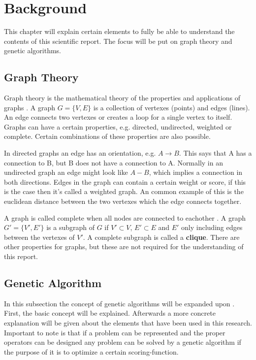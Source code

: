\section{Background}
\label{sec:background}
This chapter will explain certain elements to fully be able to understand the contents of this scientific report.
The focus will be put on graph theory and genetic algorithms.

\subsection{Graph Theory}
Graph theory is the mathematical theory of the properties and applications of graphs \cite{Demoen}.
A graph $G=\lbrace V,E \rbrace$ is a collection of vertexes (points) and edges (lines).
An edge connects two vertexes or creates a loop for a single vertex to itself.
Graphs can have a certain properties, e.g. directed, undirected, weighted or complete.
Certain combinations of these properties are also possible.

In directed graphs an edge has an orientation, e.g. $A \rightarrow B$. This says that A has a connection to B, but B does not have a connection to A.
Normally in an undirected graph an edge might look like $A - B$, which implies a connection in both directions. Edges in the graph can contain a certain weight or score, if this is the case then it's called a weighted graph.
An common example of this is the euclidean distance between the two vertexes which the edge connects together.

A graph is called complete when all nodes are connected to eachother \cite{Demoen}.
A graph $G'=\lbrace V',E' \rbrace$ is a subgraph of $G$ if $V' \subset V$, $E' \subset E$ and $E'$ only including edges between the vertexes of $V'$.
A complete subgraph is called a \textbf{clique}.
There are other properties for graphs, but these are not required for the understanding of this report.

\subsection{Genetic Algorithm}
In this subsection the concept of genetic algorithms will be expanded upon \cite{genetics}. 
First, the basic concept will be explained. 
Afterwards a more concrete explanation will be given about the elements that have been used in this research.
Important to note is that if a problem can be represented and the proper operators can be designed any problem can be solved by a genetic algorithm if the purpose of it is to optimize a certain scoring-function.

